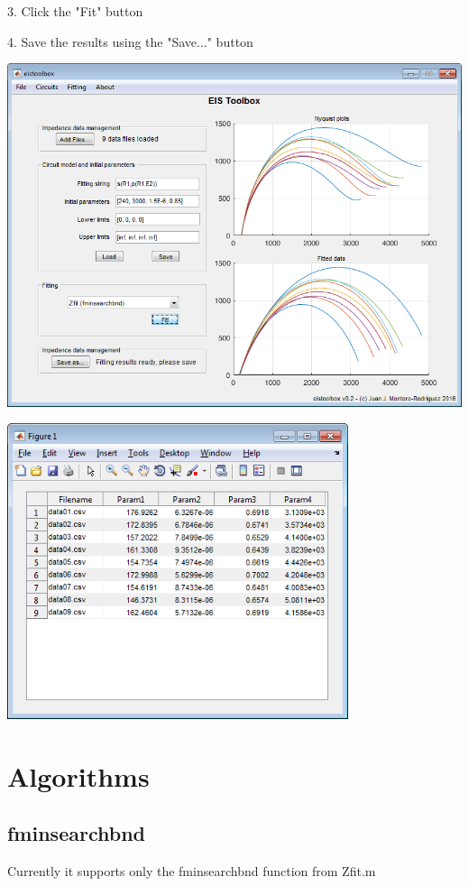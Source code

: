 \documentclass[10pt,a4paper,oneside]{memoir}
\begin{document}
3. Click the "Fit" button

4. Save the results using the "Save..." button

\includegraphics[width=15cm]{main_screenshot.png}

\includegraphics[width=10cm]{scr_results.png}


\chapter{Algorithms}

\section{fminsearchbnd}

Currently it supports only the fminsearchbnd function from Zfit.m
\end{document}
